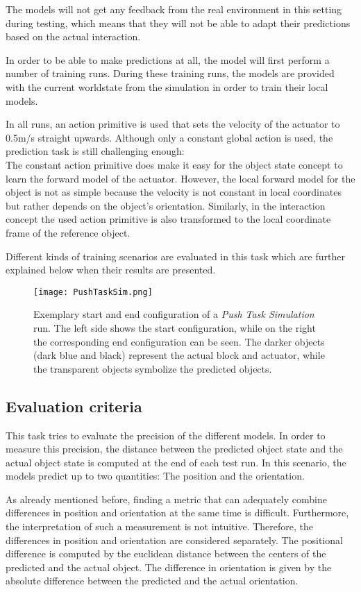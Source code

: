 The models will not get any feedback from the real environment in this setting during testing, which means that they will not be able to adapt their predictions based on the actual interaction. 

In order to be able to make predictions at all, the model will first perform a number of training runs. During these training runs, the models are provided with the current worldstate from the simulation in order to train their local models.

In all runs, an action primitive is used that sets the velocity of the actuator to 0.5m/s straight upwards. Although only a constant global action is used, the prediction task is still challenging enough: \\
The constant action primitive does make it easy for the object state concept to learn the forward model of the actuator. However, the local forward model for the object is not as simple because the velocity is not constant in local coordinates but rather depends on the object's orientation. 
Similarly, in the interaction concept the used action primitive is also transformed to the local coordinate frame of the reference object.

Different kinds of training scenarios are evaluated in this task which are further explained below when their results are presented.


\begin{figure}
	\centering
	\texttt{[image: PushTaskSim.png]}
	\caption{Exemplary start and end configuration of a \textit{Push Task Simulation} run. The left side shows the start configuration, while on the right the corresponding end configuration can be seen.
		The darker objects (dark blue and black) represent the actual block and actuator, while the transparent objects symbolize the predicted objects.}
	\label{fig:pushTaskSim}
\end{figure}


\subsection{Evaluation criteria}

This task tries to evaluate the precision of the different models. In order to measure this precision, the distance between the predicted object state and the actual object state is computed at the end of each test run.
In this scenario, the models predict up to two quantities: The position and the orientation. 

As already mentioned before, finding a metric that can adequately combine differences in position and orientation at the same time is difficult. Furthermore, the interpretation of such a measurement is not intuitive. Therefore, the differences in position and orientation are considered separately. 
The positional difference is computed by the euclidean distance between the centers of the predicted and the actual object. The difference in orientation is given by the absolute difference between the predicted and the actual orientation.


